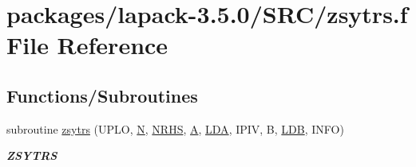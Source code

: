\hypertarget{zsytrs_8f}{}\section{packages/lapack-\/3.5.0/\+S\+R\+C/zsytrs.f File Reference}
\label{zsytrs_8f}
\subsection*{Functions/\+Subroutines}
\begin{DoxyCompactItemize}
\item 
subroutine \hyperlink{group__complex16SYcomputational_gac7f1edb566d3b930acb845919336544f}{zsytrs} (U\+P\+L\+O, \hyperlink{polmisc_8c_a0240ac851181b84ac374872dc5434ee4}{N}, \hyperlink{example__user_8c_aa0138da002ce2a90360df2f521eb3198}{N\+R\+H\+S}, \hyperlink{classA}{A}, \hyperlink{example__user_8c_ae946da542ce0db94dced19b2ecefd1aa}{L\+D\+A}, I\+P\+I\+V, B, \hyperlink{example__user_8c_a50e90a7104df172b5a89a06c47fcca04}{L\+D\+B}, I\+N\+F\+O)
\begin{DoxyCompactList}\small\item\em {\bfseries Z\+S\+Y\+T\+R\+S} \end{DoxyCompactList}\end{DoxyCompactItemize}
